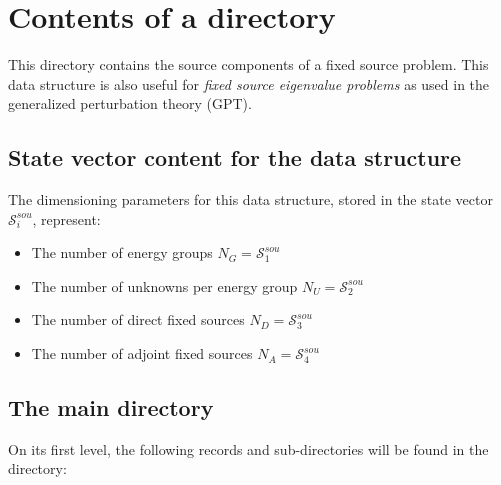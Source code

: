 \section{Contents of a  directory}\label{sect:sourcedir}

This directory contains the source components of a fixed source problem. This data structure is also useful for
{\sl fixed source eigenvalue problems} as used in the generalized perturbation theory (GPT).

\subsection{State vector content for the  data structure}\label{sect:sourcestate}

The dimensioning parameters for this data structure, stored in the state vector
$\mathcal{S}^{sou}_{i}$, represent:

\begin{itemize}

\item The number of energy groups $N_{G}=\mathcal{S}^{sou}_{1}$

\item The number of unknowns per energy group $N_{U}=\mathcal{S}^{sou}_{2}$

\item The number of direct fixed sources $N_{D}=\mathcal{S}^{sou}_{3}$

\item The number of adjoint fixed sources $N_{A}=\mathcal{S}^{sou}_{4}$

\end{itemize}

\subsection{The main  directory}\label{sect:sourcedirmain}

On its first level, the following records and sub-directories will be found in the  directory:

